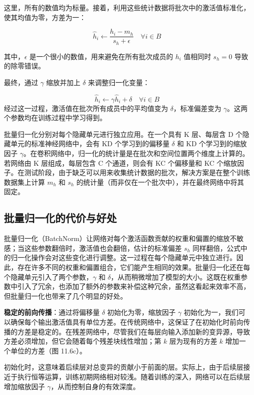 \documentclass[lang=cn,newtx,10pt,scheme=chinese]{elegantbook}
\begin{document}
这里，所有的数值均为标量。接着，利用这些统计数据将批次中的激活值标准化，使其均值为零，方差为一：

\begin{equation}
\hat{h}_i \leftarrow \frac{h_i - m_h}{s_h + \epsilon} \quad \forall i \in B 
\end{equation}

其中，\(\epsilon\) 是一个很小的数值，用来避免在所有批次成员的 \(h_i\) 值相同时 \(s_h = 0\) 导致的除零错误。

最终，通过 \(\gamma\) 缩放并加上 \(\delta\) 来调整归一化变量：

\begin{equation}
\hat{h}_i \leftarrow \gamma\hat{h}_i + \delta \quad \forall i \in B 
\end{equation}
经过这一过程，激活值在批次所有成员中的平均值变为 \(\delta\)，标准偏差变为 \(\gamma\)。这两个参数均在训练过程中学习得到。

批量归一化分别对每个隐藏单元进行独立应用。在一个具有 K 层、每层含 D 个隐藏单元的标准神经网络中，会有 KD 个学习到的偏移量 \(\delta\) 和 KD 个学习到的缩放因子 \(\gamma\)。在卷积网络中，归一化的统计量是在批次和空间位置两个维度上计算的。若网络由 K 层组成，每层包含 C 个通道，则会有 KC 个偏移量和 KC 个缩放因子。在测试阶段，由于缺乏可以用来收集统计数据的批次，解决方案是在整个训练数据集上计算 \(m_h\) 和 \(s_h\) 的统计量（而非仅在一个批次中），并在最终网络中将其固定。

\subsection{批量归一化的代价与好处}
批量归一化（BatchNorm）让网络对每个激活函数贡献的权重和偏置的缩放不敏感；当这些参数翻倍时，激活值也会翻倍，估计的标准偏差 \(s_h\) 同样翻倍，公式中的归一化操作会对这些变化进行调整。这一过程在每个隐藏单元中独立进行。因此，存在许多不同的权重和偏置组合，它们能产生相同的效果。批量归一化还在每个隐藏单元引入了两个参数，\(\gamma\) 和 \(\delta\)，从而稍微增加了模型的大小。这既在权重参数中引入了冗余，也添加了额外的参数来补偿这种冗余，虽然这看起来效率不高，但批量归一化也带来了几个明显的好处。

\textbf{稳定的前向传播}：通过将偏移量 \(\delta\) 初始化为零，缩放因子 \(\gamma\) 初始化为一，我们可以确保每个输出激活值具有单位方差。在传统网络中，这保证了在初始化时前向传播的方差是稳定的。在残差网络中，尽管我们在每层向输入添加新的变异源，导致方差必须增加，但它会随着每个残差块线性增加；第 \(k\) 层为现有的方差 \(k\) 增加一个单位的方差（图 11.6c）。

初始化时，这意味着后续层对总变异的贡献小于前面的层。实际上，由于后续层接近于执行恒等运算，训练初期网络相对较浅。随着训练的深入，网络可以在后续层增加缩放因子 \(\gamma\)，从而控制自身的有效深度。
\end{document}
